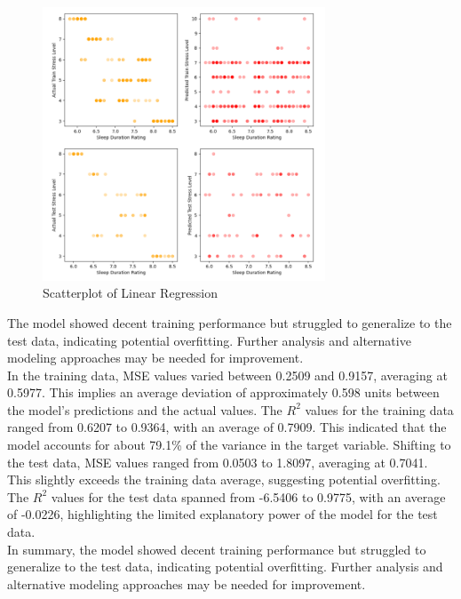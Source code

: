 \documentclass[11pt, letterpaper]{article}
\begin{document}
    \begin{figure}[H]
        \centering
        \includegraphics[width=0.75\textwidth]{linear-regression-scatterplot.png}
        \caption{Scatterplot of Linear Regression}
        \label{fig:scatterplot-lr}
    \end{figure}

    \noindent The model showed decent training performance but struggled to generalize to the test data, indicating potential overfitting. Further analysis and alternative modeling approaches may be needed for improvement.\\
    
    \noindent In the training data, MSE values varied between 0.2509 and 0.9157, averaging at 0.5977. This implies an average deviation of approximately 0.598 units between the model's predictions and the actual values. The $R^2$ values for the training data ranged from 0.6207 to 0.9364, with an average of 0.7909. This indicated that the model accounts for about 79.1\% of the variance in the target variable. Shifting to the test data, MSE values ranged from 0.0503 to 1.8097, averaging at 0.7041. This slightly exceeds the training data average, suggesting potential overfitting. The $R^2$ values for the test data spanned from -6.5406 to 0.9775, with an average of -0.0226, highlighting the limited explanatory power of the model for the test data.\\
    
    \noindent In summary, the model showed decent training performance but struggled to generalize to the test data, indicating potential overfitting. Further analysis and alternative modeling approaches may be needed for improvement.
\end{document}
